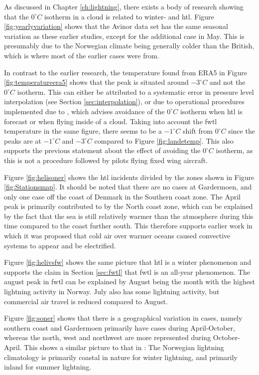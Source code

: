 As discussed in Chapter \ref{ch:lightning}, there exists a body of research showing that the $0^{\circ}C$ isotherm in a cloud is related to winter- and \acrlong{htl}. Figure \ref{fig:yearlyvariation} shows that the Avinor data set has the same seasonal variation as these earlier studies, except for the additional case in May. This is presumably due to the Norwegian climate being generally colder than the British, which is where most of the earlier cases were from. 

In contrast to the earlier research, the temperature found from ERA5 in Figure \ref{fig:temperatureera5} shows that the peak is situated around $-3^{\circ}C$ and not the $0^{\circ}C$ isotherm. This can either be attributed to a systematic error in pressure level interpolation (see Section \ref{sec:interpolation}), or due to operational procedures implemented due to \cite{lande1999}, which advises avoidance of the $0^{\circ}C$ isotherm when \acrshort{htl} is forecast or when flying inside of a cloud. Taking into account the \acrshort{fwtl} temperature in the same figure, there seems to be a $-1^{\circ}C$ shift from $0^{\circ}C$ since the peaks are at $-1^{\circ}C$ and $-3^{\circ}C$ compared to Figure \ref{fig:landetemp}. This also supports the previous statement about the effect of avoiding the $0^{\circ}C$ isotherm, as this is not a procedure followed by pilots flying fixed wing aircraft.

Figure \ref{fig:helisoner} shows the \acrshort{htl} incidents divided by the zones shown in Figure \ref{fig:Stationsmap}. It should be noted that there are no cases at Gardermoen, and only one case off the coast of Denmark in the Southern coast zone. The April peak is primarily contributed to by the North coast zone, which can be explained by the fact that the sea is still relatively warmer than the atmosphere during this time compared to the coast further south. This therefore supports earlier work in which it was proposed that cold air over warmer oceans caused convective systems to appear and be electrified. 

Figure \ref{fig:helivsfw} shows the same picture that \acrshort{htl} is a winter phenomenon and supports the claim in Section \ref{sec:fwtl} that \acrshort{fwtl} is an all-year phenomenon. The august peak in \acrshort{fwtl} can be explained by August being the month with the highest lightning activity in Norway. July also has some lightning activity, but commercial air travel is reduced compared to August. 

Figure \ref{fig:soner} shows that there is a geographical variation in cases, namely southern coast and Gardermoen primarily have cases during April-October, whereas the north, west and northwest are more represented during October-April. This shows a similar picture to that in \cite{koeltzow2018}: The Norwegian lightning climatology is primarily coastal in nature for winter lightning, and primarily inland for summer lightning. 

